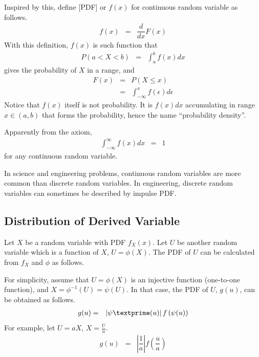 Inspired by this, define [PDF] or $f(x)$ for continuous random variable as follows. 
\begin{eqnarray}
	f(x) &=& \dfrac{d}{dx}F(x) \nonumber
\end{eqnarray}
With this definition, $f(x)$ is such function that
\begin{eqnarray}
	P(a < X < b) &=& \int_{a}^{b}f(x)dx \nonumber
\end{eqnarray}
gives the probability of $X$ in a range, and
\begin{eqnarray}
	F(x) &=& P(X\leq x) \nonumber \\
	&=& \int_{-\infty}^{x} f(\epsilon)d\epsilon \nonumber
\end{eqnarray}
Notice that $f(x)$ itself is not probability. It is $f(x)dx$ accumulating in range $x \in (a, b)$ that forms the probability, hence the name ``probability density''.

Apparently from the axiom,
\begin{eqnarray}
	\int_{-\infty}^{\infty}f(x)dx &=& 1 \label{eq:pdf-axiom}
\end{eqnarray}
for any continuous random variable.

In science and engineering problems, continuous random variables are more common than discrete random variables. In engineering, discrete random variables can sometimes be described by impulse PDF.

\subsection{Distribution of Derived Variable}

Let $X$ be a random variable with PDF $f_X(x)$. Let $U$ be another random variable which is a function of $X$, $U=\phi(X)$. The PDF of $U$ can be calculated from $f_X$ and $\phi$ as follows.

For simplicity, assume that $U=\phi(X)$ is an injective function (one-to-one function), and $X=\phi^{-1}(U)=\psi(U)$. In that case, the PDF of $U$, $g(u)$, can be obtained as follows.
\begin{eqnarray}
	g(u) &=& \left|\psi\textprime(u)\right|f\left(\psi(u)\right) \nonumber
\end{eqnarray}
For example, let $U=aX$, $X=\frac{U}{a}$.
\begin{eqnarray}
	g(u) &=& \left|\dfrac{1}{a}\right|f\left(\dfrac{u}{a}\right) \nonumber
\end{eqnarray}

